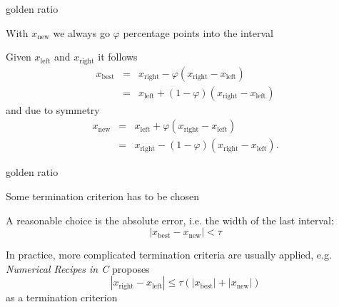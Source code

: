 \documentclass[11pt,compress,t,notes=noshow, xcolor=table]{beamer}
\newcommand{\xleft}{x_{\text{left}}}
\newcommand{\xright}{x_{\text{right}}}
\newcommand{\xnew}{x_{\text{new}}}
\newcommand{\xbest}{x_{\text{best}}}
\begin{document}
\begin{framei}[fs=normalsize,sep=L]{golden ratio}
\item With $\xnew$ we always go $\varphi$ percentage points into the interval
\item Given $\xleft$ and $\xright$ it follows
\begin{eqnarray*}
\xbest&=&\xright-\varphi(\xright-\xleft)\\
&=&\xleft+(1-\varphi)(\xright-\xleft)
\end{eqnarray*}
and due to symmetry
\begin{eqnarray*}
\xnew&=& \xleft+\varphi(\xright-\xleft)\\ &=& \xright-(1-\varphi)(\xright-\xleft).
\end{eqnarray*}
\end{framei}

\begin{framei}[sep=L]{golden ratio}
\item Some termination criterion has to be chosen 
\item A reasonable choice is the absolute error, i.e. the width of the last interval:
$$|\xbest-\xnew| < \tau$$
\item In practice, more complicated termination criteria are usually applied, e.g. \emph{Numerical Recipes in C}  proposes
$$|\xright-\xleft| \le \tau (|\xbest| + |\xnew|)$$
as a termination criterion
\end{framei}

\endlecture
\end{document}
